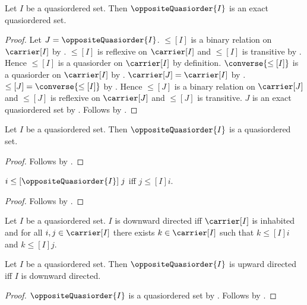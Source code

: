 \begin{theorem}\label{opposite_quasiorder_is_exact}
    Let $I$ be a quasiordered set.
    Then $\oppositeQuasiorder{I}$ is an exact quasiordered set.
\end{theorem}
\begin{proof}
    Let $J=\oppositeQuasiorder{I}$.
    $\leq[I]$ is a binary relation on $\carrier[I]$ by
        .
    $\leq[I]$ is reflexive on $\carrier[I]$ and
        $\leq[I]$ is transitive by
        .
    Hence $\leq[I]$ is a quasiorder on $\carrier[I]$ by definition.
    $\converse{\leq[I]}$ is a quasiorder on $\carrier[I]$ by
        .
    $\carrier[J]=\carrier[I]$ by .
    $\leq[J]=\converse{\leq[I]}$ by
        .
    Hence $\leq[J]$ is a binary relation on $\carrier[J]$ and
        $\leq[J]$ is reflexive on $\carrier[J]$ and
        $\leq[J]$ is transitive.
    $J$ is an exact quasiordered set by
        .
    Follows by \auto.
\end{proof}

\begin{classification}\label{opposite_quasiorder_is_quasiordered}
    Let $I$ be a quasiordered set.
    Then $\oppositeQuasiorder{I}$ is a quasiordered set.
\end{classification}
\begin{proof}
    Follows by .
\end{proof}

\begin{proposition}\label{opposite_quasiorder_order_iff}
    $i\mathrel{\leq[\oppositeQuasiorder{I}]}j$ iff
        $j\mathrel{\leq[I]}i$.
\end{proposition}
\begin{proof}
    Follows by .
\end{proof}

\begin{definition}\label{downward_directed_quasiorder}
    Let $I$ be a quasiordered set.
    $I$ is downward directed iff $\carrier[I]$ is inhabited and
        for all $i,j\in\carrier[I]$ there exists $k\in\carrier[I]$
        such that $k\mathrel{\leq[I]}i$ and
        $k\mathrel{\leq[I]}j$.
\end{definition}

\begin{proposition}\label{opposite_upward_directed_iff_downward_directed}
    Let $I$ be a quasiordered set.
    Then $\oppositeQuasiorder{I}$ is upward directed iff
        $I$ is downward directed.
\end{proposition}
\begin{proof}
    $\oppositeQuasiorder{I}$ is a quasiordered set by
        .
    Follows by
        .
\end{proof}

